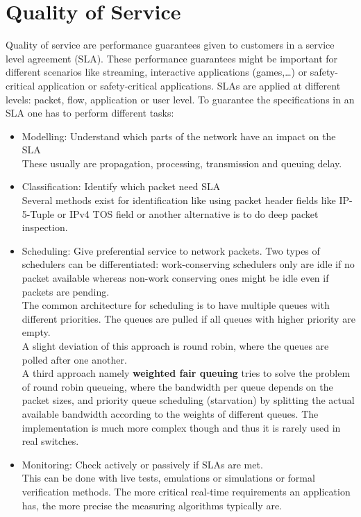 
\section{Quality of Service}
Quality of service are performance guarantees given to customers in a service level agreement (SLA).
These performance guarantees might be important for different scenarios like streaming, interactive applications (games,\dots) or safety-critical application or safety-critical applications.
SLAs are applied at different levels: packet, flow, application or user level.
To guarantee the specifications in an SLA one has to perform different tasks:
\begin{itemize}
  \item Modelling: Understand which parts of the network have an impact on the SLA\\
    These usually are propagation, processing, transmission and queuing delay.
  \item Classification: Identify which packet need SLA\\
    Several methods exist for identification like using packet header fields like IP-5-Tuple or IPv4 TOS field or another alternative is to do deep packet inspection.
  \item Scheduling: Give preferential service to network packets.
    Two types of schedulers can be differentiated: work-conserving schedulers only are idle if no packet available whereas non-work conserving ones might be idle even if packets are pending.\\
    The common architecture for scheduling is to have multiple queues with different priorities.
    The queues are pulled if all queues with higher priority are empty.\\
    A slight deviation of this approach is round robin, where the queues are polled after one another.\\
    A third approach namely \textbf{weighted fair queuing} tries to solve the problem of round robin queueing, where the bandwidth per queue depends on the packet sizes, and priority queue scheduling (starvation) by splitting the actual available bandwidth according to the weights of different queues.
    The implementation is much more complex though and thus it is rarely used in real switches.
  \item Monitoring: Check actively or passively if SLAs are met.\\
    This can be done with live tests, emulations or simulations or formal verification methods.
    The more critical real-time requirements an application has, the more precise the measuring algorithms typically are.
\end{itemize}

